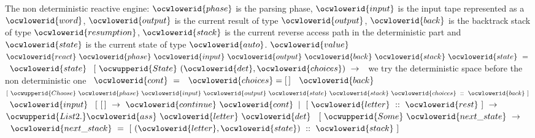 \documentclass[12pt]{article}
\begin{document}
\ocwendcode{}\ocwindent{0.00em}
The non deterministic reactive engine:                                    
\ocweol
\ocwindent{0.00em}
\ocwbegindcode{}$\ocwlowerid{phase}$\ocwenddcode{} is the parsing phase,                                             
\ocweol
\ocwindent{0.00em}
\ocwbegindcode{}$\ocwlowerid{input}$\ocwenddcode{} is the input tape represented as a \ocwbegindcode{}$\ocwlowerid{word}$\ocwenddcode{},                        
\ocweol
\ocwindent{0.00em}
\ocwbegindcode{}$\ocwlowerid{output}$\ocwenddcode{} is the current result of type \ocwbegindcode{}$\ocwlowerid{output}$\ocwenddcode{},                          
\ocweol
\ocwindent{0.00em}
\ocwbegindcode{}$\ocwlowerid{back}$\ocwenddcode{} is the backtrack stack of type \ocwbegindcode{}$\ocwlowerid{resumption}$\ocwenddcode{},                       
\ocweol
\ocwindent{0.00em}
\ocwbegindcode{}$\ocwlowerid{stack}$\ocwenddcode{} is the current reverse access path in the deterministic part and  
\ocweol
\ocwindent{0.00em}
\ocwbegindcode{}$\ocwlowerid{state}$\ocwenddcode{} is the current state of type \ocwbegindcode{}$\ocwlowerid{auto}$\ocwenddcode{}.                              
\ocweol
\label{../ML/reactt.ml:3725}%
\medskip
\ocwbegincode{}\ocwindent{0.00em}
$\ocwlowerid{value}~$~$\ocwlowerid{react}~\ocwlowerid{phase}~\ocwlowerid{input}~\ocwlowerid{output}~\ocwlowerid{back}~\ocwlowerid{stack}~\ocwlowerid{state}~=~$~$\ocwlowerid{state}~$\ocweol
\ocwindent{1.00em}
$[~\ocwupperid{State}~(\ocwlowerid{det},\ocwlowerid{choices})~\rightarrow{}~$\ocweol
\ocwindent{2.00em}
\ocwbc{} we try the deterministic space before the non deterministic one \ocwec{}\ocweol
\ocwindent{2.00em}
~$\ocwlowerid{cont}~=~$~$\ocwlowerid{choices}=[\,]~$~$\ocwlowerid{back}$\ocweol
\ocwindent{7.50em}
~$[~\ocwupperid{Choose}~\ocwlowerid{phase}~\ocwlowerid{input}~\ocwlowerid{output}~\ocwlowerid{state}~\ocwlowerid{stack}~\ocwlowerid{choices}~::~\ocwlowerid{back}~]~$\ocweol
\ocwindent{2.00em}
~$\ocwlowerid{input}~$\ocweol
\ocwindent{3.50em}
$[~[\,]~\rightarrow{}~\ocwlowerid{continue}~\ocwlowerid{cont}$\ocweol
\ocwindent{3.50em}
$\mid{}~[~\ocwlowerid{letter}~::~\ocwlowerid{rest}~]~\rightarrow{}~$~$\ocwupperid{List2.}\ocwlowerid{ass}~\ocwlowerid{letter}~\ocwlowerid{det}~$\ocweol
\ocwindent{7.00em}
$[~\ocwupperid{Some}~\ocwlowerid{next\_state}~\rightarrow{}~$\ocweol
\ocwindent{9.00em}
~$\ocwlowerid{next\_stack}~=~[~(\ocwlowerid{letter},\ocwlowerid{state})~::~\ocwlowerid{stack}~]~$\ocweol
\end{document}
